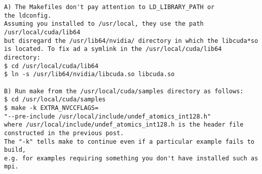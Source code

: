 \begin{enumerate}
\begin{verbatim}
A) The Makefiles don't pay attention to LD_LIBRARY_PATH or 
the ldconfig.
Assuming you installed to /usr/local, they use the path 
/usr/local/cuda/lib64 
but disregard the /usr/lib64/nvidia/ directory in which the libcuda*so
is located. To fix ad a symlink in the /usr/local/cuda/lib64 directory:
$ cd /usr/local/cuda/lib64
$ ln -s /usr/lib64/nvidia/libcuda.so libcuda.so

B) Run make from the /usr/local/cuda/samples directory as follows:
$ cd /usr/local/cuda/samples
$ make -k EXTRA_NVCCFLAGS=
"--pre-include /usr/local/include/undef_atomics_int128.h"
where /usr/local/include/undef_atomics_int128.h is the header file 
constructed in the previous post.
The "-k" tells make to continue even if a particular example fails to build,
e.g. for examples requiring something you don't have installed such as mpi. 
\end{verbatim}
\end{enumerate}
